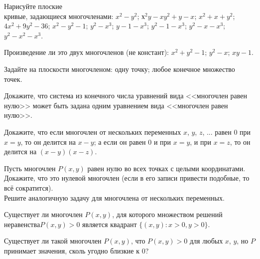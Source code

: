 \documentclass[a4paper, 12pt]{article}
\begin{document}
  Нарисуйте плоские\\ кривые, задающиеся многочленами:
 $x^2-y^2$;
 $х^2y-xy^2+y-x$;
 $x^2+x+y^2$;
 $4x^2+9y^2-36$;
 $x^2-y^2-1$;
 $y^2-x^3$;
 $y-1-x^3$;
 $y^2-1-x^3$;
 $y^2-x-x^3$;
 $y^2-x^2-x^3$.

 Произведение ли это двух многочленов (не констант):
 $x^2+y^2-1$;  $y^2-x$;  $xy-1$.


Задайте на плоскости многочленом:  одну точку;  любое конечное множество точек.

Докажите, что система из конечного числа уравнений вида <<многочлен равен нулю>>
может быть задана одним уравнением вида <<многочлен равен нулю>>.

 Докажите, что если многочлен от нескольких переменных $x$, $y$, $z$, ... равен 0 при $x=y$, то он делится на $x-y$;
 а если он равен 0 и при $x=y$, и при $x=z$, то он делится на $(x-y)(x-z)$.

 Пусть многочлен $P(x,y)$ равен нулю во всех точках с целыми координатами. Докажите, что это нулевой многочлен (если в его записи привести подобные, то всё сократится).\\
 Решите аналогичную задачу для многочлена от нескольких переменных.


Существует ли многочлен $P(x,y)$, для которого множеством решений неравенства\break $P(x,y) > 0$ является квадрант $\{(x,y) : x>0, y>0\}$.

Существует ли такой многочлен $P(x, y)$, что $P(x, y) > 0$ для любых $x$, $y$, но $P$ принимает
значения, сколь угодно близкие к 0?

\end{document}

